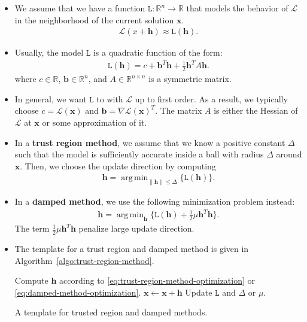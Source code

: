 \documentclass[10pt]{article}
\newcommand{\ve}[1]{\mathbf{#1}}
\newcommand{\ra}{\rightarrow}
\newcommand{\mcal}[1]{\mathcal{#1}}
\newcommand{\Real}{\mathbb{R}}
\DeclareMathOperator*{\argmin}{arg\,min}
\begin{document}
\begin{itemize}    
    \item We assume that we have a function $\mathtt{L}: \Real^n \ra \Real$ that models the behavior of $\mcal{L}$ in the neighborhood of the current solution $\ve{x}$.
    \begin{align*}
        \mcal{L}(x + \ve{h}) \approx \mathtt{L}(\ve{h}).
    \end{align*}
    
    \item Usually, the model $\mathtt{L}$ is a quadratic function of the form:
    \begin{align*}
        \mathtt{L}(\ve{h}) = c + \ve{b}^T \ve{h} + \frac{1}{2} \ve{h}^T A \ve{h}.
    \end{align*}
    where $c \in \Real$, $\ve{b} \in \Real^n$, and $A \in \Real^{n \times n}$ is a symmetric matrix.

    \item In general, we want $\mathtt{L}$ to with $\mcal{L}$ up to first order. As a result, we typically choose $c = \mcal{L}(\ve{x})$ and $\ve{b} = \nabla\mcal{L}(\ve{x})^T$. The matrix $A$ is either the Hessian of $\mcal{L}$ at $\ve{x}$ or some approximation of it.
    
    \item In a {\bf trust region method}, we assume that we know a positive constant $\Delta$ such that the model is sufficiently accurate inside a ball with radius $\Delta$ around $\ve{x}$. Then, we choose the update direction by computing
    \begin{align}
        \ve{h} = \argmin_{\| \ve{h} \| \leq \Delta} \{ \mathtt{L}(\ve{h}) \}. \label{eq:trust-region-method-optimization}
    \end{align}

    \item In a {\bf damped method}, we use the following minimization problem instead:
    \begin{align}
        \ve{h} = \argmin_{\ve{h}} \bigg\{ \mathtt{L}(\ve{h}) + \frac{1}{2}\mu \ve{h}^T \ve{h} \bigg\}. \label{eq:damped-method-optimization}
    \end{align}
    The term $\frac{1}{2}\mu\ve{h}^T \ve{h}$ penalize large update direction.

    \item The template for a trust region and damped method is given in Algorithm~\ref{algo:trust-region-method}.    

    \begin{algorithm}
        \begin{algorithmic}
                \State Compute $\ve{h}$ according to \eqref{eq:trust-region-method-optimization} or \eqref{eq:damped-method-optimization}.
                \If {$\mcal{L}(x + \ve{h}) < \mcal{L}(\ve{x})$}
                    \State $\ve{x} \gets \ve{x} + \ve{h}$
                \EndIf
                \State Update $\mathtt{L}$ and $\Delta$ or $\mu$.
            \EndWhile
        \end{algorithmic}
        \caption{A template for trusted region and damped methods.}
        \label{algo:trust-region-method}
    \end{algorithm}


\end{itemize}
\end{document}
